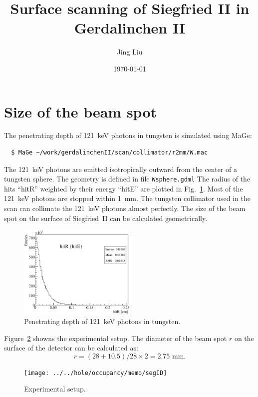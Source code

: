 \documentclass[12pt, a4paper]{article}
\title{Surface scanning of Siegfried II in Gerdalinchen II}
\author{Jing Liu}
\date{\today{}}
\begin{document}
\maketitle{}
\tableofcontents

\section{Size of the beam spot}
\label{s:col}
The penetrating depth of 121~keV photons in tungsten is simulated
using MaGe:
\begin{lstlisting}
  $ MaGe ~/work/gerdalinchenII/scan/collimator/r2mm/W.mac
\end{lstlisting}
The 121~keV photons are emitted isotropically outward from the center
of a tungsten sphere. The geometry is defined in file
\lstinline!Wsphere.gdml! The radius of the hits ``hitR'' weighted by
their energy ``hitE'' are plotted in Fig.~\ref{f:w121}. Most of the
121~keV photons are stopped within 1~mm. The tungsten collimator used
in the scan can collimate the 121~keV photons almost perfectly. The
size of the beam spot on the surface of Siegfried~II can be calculated
geometrically. 

\begin{figure}[fptb]
  \centering
  \includegraphics[width=0.5\textwidth]{w121keV}
  \caption{Penetrating depth of 121~keV photons in tungsten.}
  \label{f:w121}
\end{figure}

Figure~\ref{f:setup} showns the experimental setup. The diameter of
the beam spot $r$ on the surface of the detector can be calculated as:
\begin{equation}
  \label{e:size}
  r = (28+10.5)/28 \times 2 = 2.75 \text{ mm}.
\end{equation}

\begin{figure}[fptb]
  \centering
  \texttt{[image: ../../hole/occupancy/memo/segID]}
  \caption{Experimental setup.}
  \label{f:setup}
\end{figure}
\end{document}
